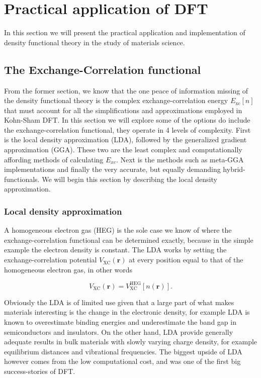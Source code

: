 \chapter{Practical application of DFT}
\label{sec:Practical DFT}

In this section we will present the practical application and implementation of density functional theory in the study of materials science.

\section{The Exchange-Correlation functional}
From the former section, we know that the one peace of information missing of the density functional theory is the complex exchange-correlation energy $E_{\text{xc}}[n]$ that must account for all the simplifications and approximations employed in Kohn-Sham DFT. In this section we will explore some of the options do include the exchange-correlation functional, they operate in 4 levels of complexity. First is the local density approximation (LDA), followed by the generalized gradient approximation (GGA). These two are the least complex and computationally affording methods of calculating $E_{xc}$. Next is the methods such as meta-GGA implementations and finally the very accurate, but equally demanding hybrid-functionals. We will begin this section by describing the local density approximation.    

\subsection{Local density approximation}
A homogeneous electron gas (HEG) is the sole case we know of where the exchange-correlation functional can be determined exactly, because in the simple example the electron density is constant. The LDA works by setting the exchange-correlation potential $V_\text{XC}(\boldsymbol{r})$ at every position equal to that of the homogeneous electron gas, in other words

\begin{equation}
V_\text{XC}(\boldsymbol{r}) = V_\text{XC} ^\text{HEG}[n(\boldsymbol{r})] .
\end{equation} 

Obviously the LDA is of limited use given that a large part of what makes materials interesting is the change in the electronic density, for example LDA is known to overestimate binding energies and  underestimate the band gap in semiconductors and insulators. On the other hand, LDA provide generally adequate results in bulk materials with slowly varying charge density, for example equilibrium distances and vibrational frequencies. The biggest upside of LDA however comes from the low computational cost, and was one of the first big success-stories of DFT. 


